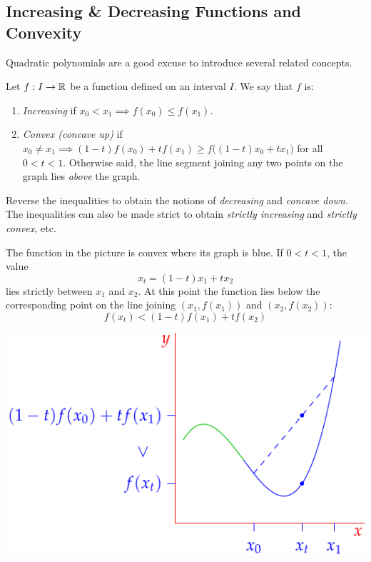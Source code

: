 \iffalse
\clearpage



\subsection{Increasing \& Decreasing Functions and Convexity}



Quadratic polynomials are a good excuse to introduce several related concepts.

\begin{defn}{}{}
Let $f:I\to\mathbb{R}$ be a function defined on an interval $I$. We say that $f$ is:
\begin{enumerate}
  \item \emph{Increasing} if $x_0<x_1\implies f(x_0)\le f(x_1)$.
	\item \emph{Convex (concave up)} if $x_0\neq x_1\implies (1-t)f(x_0)+tf(x_1)\ge f\bigl((1-t)x_0+tx_1\bigr)$ for all $0<t<1$. Otherwise said, the line segment joining any two points on the graph lies \emph{above} the graph.
\end{enumerate}
Reverse the inequalities to obtain the notions of \emph{decreasing} and \emph{concave down.} The inequalities can also be made strict to obtain \emph{strictly increasing} and \emph{strictly convex,} etc.
\end{defn}

\begin{minipage}[t]{0.45\linewidth}\vspace{0pt}
The function in the picture is convex where its graph is blue. If $0<t<1$, the  value
\[x_t=(1-t)x_1+tx_2\]
lies strictly between $x_1$ and $x_2$. At this point the function lies below the corresponding point on the line joining $(x_1,f(x_1))$ and $(x_2,f(x_2))$:
\[f(x_t)<(1-t)f(x_1)+tf(x_2)\]
\end{minipage}\begin{minipage}[t]{0.55\linewidth}\vspace{0pt}
\flushright\includegraphics{poly-convex}
\end{minipage}\par

